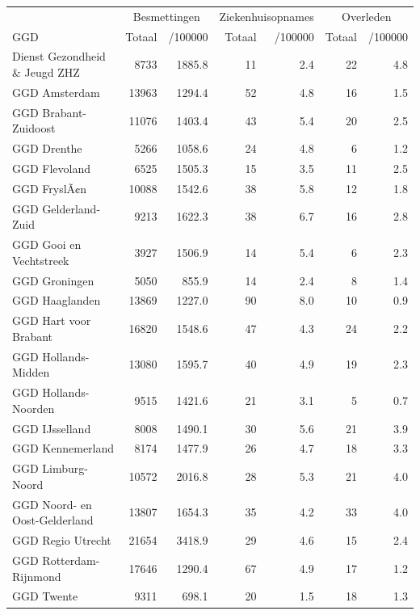 \documentclass[
  english,
  man,floatsintext]{apa6}
\begin{document}
\begin{table}
\centering\begingroup\fontsize{10}{12}\selectfont

\begin{threeparttable}
\begin{tabular}{lrrrrrr}
\toprule
\multicolumn{1}{c}{ } & \multicolumn{2}{c}{Besmettingen} & \multicolumn{2}{c}{Ziekenhuisopnames} & \multicolumn{2}{c}{Overleden} \\
\cmidrule(l{3pt}r{3pt}){2-3} \cmidrule(l{3pt}r{3pt}){4-5} \cmidrule(l{3pt}r{3pt}){6-7}
GGD & Totaal & /100000 & Totaal & /100000 & Totaal & /100000\\
\midrule
Dienst Gezondheid \& Jeugd ZHZ & 8733 & 1885.8 & 11 & 2.4 & 22 & 4.8\\
GGD Amsterdam & 13963 & 1294.4 & 52 & 4.8 & 16 & 1.5\\
GGD Brabant-Zuidoost & 11076 & 1403.4 & 43 & 5.4 & 20 & 2.5\\
GGD Drenthe & 5266 & 1058.6 & 24 & 4.8 & 6 & 1.2\\
GGD Flevoland & 6525 & 1505.3 & 15 & 3.5 & 11 & 2.5\\
GGD FryslÃ¢n & 10088 & 1542.6 & 38 & 5.8 & 12 & 1.8\\
GGD Gelderland-Zuid & 9213 & 1622.3 & 38 & 6.7 & 16 & 2.8\\
GGD Gooi en Vechtstreek & 3927 & 1506.9 & 14 & 5.4 & 6 & 2.3\\
GGD Groningen & 5050 & 855.9 & 14 & 2.4 & 8 & 1.4\\
GGD Haaglanden & 13869 & 1227.0 & 90 & 8.0 & 10 & 0.9\\
GGD Hart voor Brabant & 16820 & 1548.6 & 47 & 4.3 & 24 & 2.2\\
GGD Hollands-Midden & 13080 & 1595.7 & 40 & 4.9 & 19 & 2.3\\
GGD Hollands-Noorden & 9515 & 1421.6 & 21 & 3.1 & 5 & 0.7\\
GGD IJsselland & 8008 & 1490.1 & 30 & 5.6 & 21 & 3.9\\
GGD Kennemerland & 8174 & 1477.9 & 26 & 4.7 & 18 & 3.3\\
GGD Limburg-Noord & 10572 & 2016.8 & 28 & 5.3 & 21 & 4.0\\
GGD Noord- en Oost-Gelderland & 13807 & 1654.3 & 35 & 4.2 & 33 & 4.0\\
GGD Regio Utrecht & 21654 & 3418.9 & 29 & 4.6 & 15 & 2.4\\
GGD Rotterdam-Rijnmond & 17646 & 1290.4 & 67 & 4.9 & 17 & 1.2\\
GGD Twente & 9311 & 698.1 & 20 & 1.5 & 18 & 1.3\\

\end{tabular}
\end{threeparttable}
\end{table}
\end{document}
